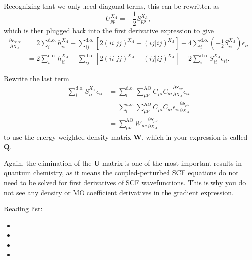 \documentclass[%
class = book,%
crop = false,%
float = true,%
multi = true,%
preview = false,%
]{standalone}
\begin{document}
Recognizing that we only need diagonal terms, this can be rewritten as
\begin{equation}
  U_{pp}^{X_{A}} = -\frac{1}{2} S_{pp}^{X_{A}}, \tag{Yamaguchi eq. 4.20}
\end{equation}
which is then plugged back into the first derivative expression to give
\begin{align*}
  \frac{\partial E_{\text{elec}}}{\partial X_{A}} &= 2 \sum_{i}^{\text{d.o.}} h_{ii}^{X_{A}} + \sum_{ij}^{\text{d.o.}} \left[ 2(ii|jj)^{X_{A}} - (ij|ij)^{X_{A}} \right] + 4 \sum_{i}^{\text{d.o.}} \left( -\frac{1}{2} S_{ii}^{X_{A}} \right) \epsilon_{ii} \\
                                                  &= 2 \sum_{i}^{\text{d.o.}} h_{ii}^{X_{A}} + \sum_{ij}^{\text{d.o.}} \left[ 2(ii|jj)^{X_{A}} - (ij|ij)^{X_{A}} \right] - 2 \sum_{i}^{\text{d.o.}} S_{ii}^{X_{A}} \epsilon_{ii}. \tag{Yamaguchi eq. 4.21}
\end{align*}

Rewrite the last term
\begin{align*}
  \sum_{i}^{\text{d.o.}} S_{ii}^{X_{A}} \epsilon_{ii} &= \sum_{i}^{\text{d.o.}} \sum_{\mu\nu}^{\text{AO}} C_{\mu i} C_{\mu i} \frac{\partial S_{\mu\nu}}{\partial X_{A}} \epsilon_{ii} \\
                                                      &= \sum_{i}^{\text{d.o.}} \sum_{\mu\nu}^{\text{AO}} C_{\mu i} C_{\mu i} \epsilon_{ii} \frac{\partial S_{\mu\nu}}{\partial X_{A}} \\
                                                      &= \sum_{\mu\nu}^{\text{AO}} W_{\mu\nu} \frac{\partial S_{\mu\nu}}{\partial X_{A}} \tag{Yamaguchi eq. 4.24}
\end{align*}
to use the energy-weighted density matrix \(\mathbf{W}\), which in your expression is called \(\mathbf{Q}\).

Again, the elimination of the \(\mathbf{U}\) matrix is one of the most important results in quantum chemistry, as it means the coupled-perturbed SCF equations do not need to be solved for first derivatives of SCF wavefunctions. This is why you do not see any density or MO coefficient derivatives in the gradient expression.

Reading list:

\begin{itemize}
\item {}
\item {}
\item {}
\item {}
\end{itemize}
\end{document}
